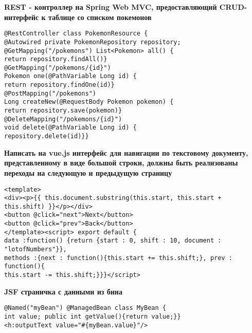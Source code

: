 \documentclass{article}
\begin{document}
\begin{minipage}[t]{0.3\textwidth}
    \textbf{REST - контроллер на Spring Web MVC, предоставляющий CRUD-интерфейс к таблице со списком покемонов}
    \begin{lstlisting}[frame=single, basicstyle=\tiny\ttfamily, breaklines=true, breakatwhitespace=true, postbreak=\mbox{\textcolor{red}{$\hookrightarrow$}\space}]
@RestController class PokemonResource {
@Autowired private PokemonRepository repository;
@GetMapping("/pokemons") List<Pokemon> all() {
return repository.findAll()}
@GetMapping("/pokemons/{id}")
Pokemon one(@PathVariable Long id) {
return repository.findOne(id)}
@PostMapping("/pokemons")
Long createNew(@RequestBody Pokemon pokemon) {
return repository.save(pokemon)}
@DeleteMapping("/pokemons/{id}")
void delete(@PathVariable Long id) {
repository.delete(id)}}
    \end{lstlisting}
\end{minipage}%
\hfill
\begin{minipage}[t]{0.3\textwidth}
    \textbf{Написать на vue.js интерфейс для навигации по текстовому документу, представленному в виде большой строки, должны быть реализованы переходы на следующую и предыдущую страницу}
    \begin{lstlisting}[frame=single, basicstyle=\tiny\ttfamily, breaklines=true, breakatwhitespace=true, postbreak=\mbox{\textcolor{red}{$\hookrightarrow$}\space}]
<template>
<div><p>{{ this.document.substring(this.start, this.start + this.shift) }}</p></div>
<button @click="next">Next</button>
<button @click="prev">Back</button>
</template><script> export default {
data :function() {return {start : 0, shift : 10, document : "lotofNumbers"}},
methods :{next : function(){this.start += this.shift;}, prev : function(){
this.start -= this.shift;}}}</script>
    \end{lstlisting}
\end{minipage}%
\hfill
\begin{minipage}[t]{0.3\textwidth}
    \textbf{JSF страничка с данными из бина}
    \begin{lstlisting}[frame=single, basicstyle=\tiny\ttfamily, breaklines=true, breakatwhitespace=true, postbreak=\mbox{\textcolor{red}{$\hookrightarrow$}\space}]
@Named("myBean") @ManagedBean class MyBean {
int value; public int getValue(){return value;}}
<h:outputText value="#{myBean.value}"/>        
    \end{lstlisting}
\end{minipage}%
\\
\end{document}
